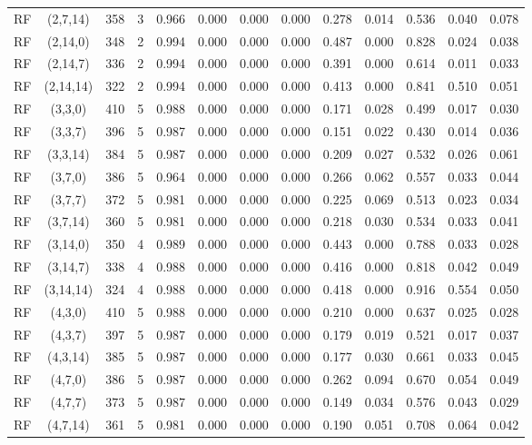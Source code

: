 \begin{longtable}{lcccccccccccc}
RF & (2,7,14) & 358 & 3 & 0.966 & 0.000 & 0.000 & 0.000 & 0.278 & 0.014 & 0.536 & 0.040 & 0.078 \\
RF & (2,14,0) & 348 & 2 & 0.994 & 0.000 & 0.000 & 0.000 & 0.487 & 0.000 & 0.828 & 0.024 & 0.038 \\
RF & (2,14,7) & 336 & 2 & 0.994 & 0.000 & 0.000 & 0.000 & 0.391 & 0.000 & 0.614 & 0.011 & 0.033 \\
RF & (2,14,14) & 322 & 2 & 0.994 & 0.000 & 0.000 & 0.000 & 0.413 & 0.000 & 0.841 & 0.510 & 0.051 \\
RF & (3,3,0) & 410 & 5 & 0.988 & 0.000 & 0.000 & 0.000 & 0.171 & 0.028 & 0.499 & 0.017 & 0.030 \\
RF & (3,3,7) & 396 & 5 & 0.987 & 0.000 & 0.000 & 0.000 & 0.151 & 0.022 & 0.430 & 0.014 & 0.036 \\
RF & (3,3,14) & 384 & 5 & 0.987 & 0.000 & 0.000 & 0.000 & 0.209 & 0.027 & 0.532 & 0.026 & 0.061 \\
RF & (3,7,0) & 386 & 5 & 0.964 & 0.000 & 0.000 & 0.000 & 0.266 & 0.062 & 0.557 & 0.033 & 0.044 \\
RF & (3,7,7) & 372 & 5 & 0.981 & 0.000 & 0.000 & 0.000 & 0.225 & 0.069 & 0.513 & 0.023 & 0.034 \\
RF & (3,7,14) & 360 & 5 & 0.981 & 0.000 & 0.000 & 0.000 & 0.218 & 0.030 & 0.534 & 0.033 & 0.041 \\
RF & (3,14,0) & 350 & 4 & 0.989 & 0.000 & 0.000 & 0.000 & 0.443 & 0.000 & 0.788 & 0.033 & 0.028 \\
RF & (3,14,7) & 338 & 4 & 0.988 & 0.000 & 0.000 & 0.000 & 0.416 & 0.000 & 0.818 & 0.042 & 0.049 \\
RF & (3,14,14) & 324 & 4 & 0.988 & 0.000 & 0.000 & 0.000 & 0.418 & 0.000 & 0.916 & 0.554 & 0.050 \\
RF & (4,3,0) & 410 & 5 & 0.988 & 0.000 & 0.000 & 0.000 & 0.210 & 0.000 & 0.637 & 0.025 & 0.028 \\
RF & (4,3,7) & 397 & 5 & 0.987 & 0.000 & 0.000 & 0.000 & 0.179 & 0.019 & 0.521 & 0.017 & 0.037 \\
RF & (4,3,14) & 385 & 5 & 0.987 & 0.000 & 0.000 & 0.000 & 0.177 & 0.030 & 0.661 & 0.033 & 0.045 \\
RF & (4,7,0) & 386 & 5 & 0.987 & 0.000 & 0.000 & 0.000 & 0.262 & 0.094 & 0.670 & 0.054 & 0.049 \\
RF & (4,7,7) & 373 & 5 & 0.987 & 0.000 & 0.000 & 0.000 & 0.149 & 0.034 & 0.576 & 0.043 & 0.029 \\
RF & (4,7,14) & 361 & 5 & 0.981 & 0.000 & 0.000 & 0.000 & 0.190 & 0.051 & 0.708 & 0.064 & 0.042 \\

\end{longtable}
